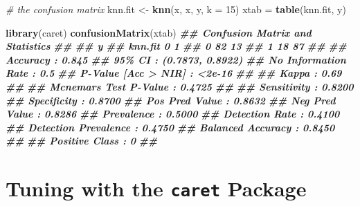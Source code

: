 \documentclass[
]{book}
\newenvironment{Shaded}{\begin{snugshade}}{\end{snugshade}}
\newcommand{\AttributeTok}[1]{\textcolor[rgb]{0.13,0.29,0.53}{#1}}
\newcommand{\CommentTok}[1]{\textcolor[rgb]{0.56,0.35,0.01}{\textit{#1}}}
\newcommand{\DecValTok}[1]{\textcolor[rgb]{0.00,0.00,0.81}{#1}}
\newcommand{\DocumentationTok}[1]{\textcolor[rgb]{0.56,0.35,0.01}{\textbf{\textit{#1}}}}
\newcommand{\FunctionTok}[1]{\textcolor[rgb]{0.13,0.29,0.53}{\textbf{#1}}}
\newcommand{\NormalTok}[1]{#1}
\newcommand{\OtherTok}[1]{\textcolor[rgb]{0.56,0.35,0.01}{#1}}
\theoremstyle{definition}
\theoremstyle{definition}
\theoremstyle{definition}
\theoremstyle{definition}
\theoremstyle{remark}
\begin{document}
\begin{Shaded}
\begin{Highlighting}[]
  \CommentTok{\# the confusion matrix}
\NormalTok{  knn.fit }\OtherTok{\textless{}{-}} \FunctionTok{knn}\NormalTok{(x, x, y, }\AttributeTok{k =} \DecValTok{15}\NormalTok{)}
\NormalTok{  xtab }\OtherTok{=} \FunctionTok{table}\NormalTok{(knn.fit, y)}
  
  \FunctionTok{library}\NormalTok{(caret)}
  \FunctionTok{confusionMatrix}\NormalTok{(xtab)}
\DocumentationTok{\#\# Confusion Matrix and Statistics}
\DocumentationTok{\#\# }
\DocumentationTok{\#\#        y}
\DocumentationTok{\#\# knn.fit  0  1}
\DocumentationTok{\#\#       0 82 13}
\DocumentationTok{\#\#       1 18 87}
\DocumentationTok{\#\#                                           }
\DocumentationTok{\#\#                Accuracy : 0.845           }
\DocumentationTok{\#\#                  95\% CI : (0.7873, 0.8922)}
\DocumentationTok{\#\#     No Information Rate : 0.5             }
\DocumentationTok{\#\#     P{-}Value [Acc \textgreater{} NIR] : \textless{}2e{-}16          }
\DocumentationTok{\#\#                                           }
\DocumentationTok{\#\#                   Kappa : 0.69            }
\DocumentationTok{\#\#                                           }
\DocumentationTok{\#\#  Mcnemar\textquotesingle{}s Test P{-}Value : 0.4725          }
\DocumentationTok{\#\#                                           }
\DocumentationTok{\#\#             Sensitivity : 0.8200          }
\DocumentationTok{\#\#             Specificity : 0.8700          }
\DocumentationTok{\#\#          Pos Pred Value : 0.8632          }
\DocumentationTok{\#\#          Neg Pred Value : 0.8286          }
\DocumentationTok{\#\#              Prevalence : 0.5000          }
\DocumentationTok{\#\#          Detection Rate : 0.4100          }
\DocumentationTok{\#\#    Detection Prevalence : 0.4750          }
\DocumentationTok{\#\#       Balanced Accuracy : 0.8450          }
\DocumentationTok{\#\#                                           }
\DocumentationTok{\#\#        \textquotesingle{}Positive\textquotesingle{} Class : 0               }
\DocumentationTok{\#\# }
\end{Highlighting}
\end{Shaded}

\hypertarget{tuning-with-the-caret-package}{%
\section{\texorpdfstring{Tuning with the \texttt{caret} Package}{Tuning with the caret Package}}\label{tuning-with-the-caret-package}}
\end{document}
